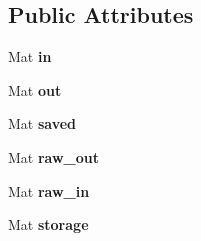 \subsection*{Public Attributes}
\begin{DoxyCompactItemize}
\item 
\hypertarget{classvision_a628e5f4db4cf2b380fa9849b1c7c6ede}{Mat {\bfseries in}}\label{classvision_a628e5f4db4cf2b380fa9849b1c7c6ede}

\item 
\hypertarget{classvision_a8e6f2872c854246898bdaf75db8bc219}{Mat {\bfseries out}}\label{classvision_a8e6f2872c854246898bdaf75db8bc219}

\item 
\hypertarget{classvision_aaa8cc8d3f4860c2fe40b54d30ba3bb73}{Mat {\bfseries saved}}\label{classvision_aaa8cc8d3f4860c2fe40b54d30ba3bb73}

\item 
\hypertarget{classvision_ae5f3eff88240c3cb76eb6b6018cc7fea}{Mat {\bfseries raw\-\_\-out}}\label{classvision_ae5f3eff88240c3cb76eb6b6018cc7fea}

\item 
\hypertarget{classvision_a8be17d4889ad9b9154f3d90825893b70}{Mat {\bfseries raw\-\_\-in}}\label{classvision_a8be17d4889ad9b9154f3d90825893b70}

\item 
\hypertarget{classvision_adf6eda2658af488a78cbf3d4e9fc9612}{Mat {\bfseries storage}}\label{classvision_adf6eda2658af488a78cbf3d4e9fc9612}

\end{DoxyCompactItemize}
